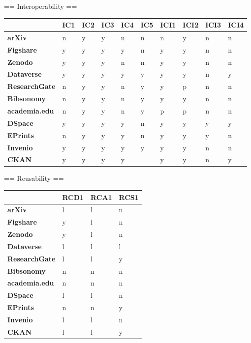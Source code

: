 == Interoperability ==

\begin{tabular}{|m{2.1cm}|m{0.8cm}|m{0.8cm}|m{0.8cm}|m{0.8cm}|m{0.8cm}|m{0.8cm}|m{0.8cm}|m{0.8cm}|m{0.8cm}|} \hline 
 & \textbf{IC1}  & \textbf{IC2}  & \textbf{IC3}  & \textbf{IC4}  & \textbf{IC5}  & \textbf{ICI1}  & \textbf{ICI2}  & \textbf{ICI3}  & \textbf{ICI4}  \\ \hline 
\textbf{arXiv}  &n &y &y &n &n &n &y &n &n \\ \hline 
\textbf{Figshare}  &y &y &y &y &n &y &y &n &n \\ \hline 
\textbf{Zenodo}  &y &y &y &n &n &y &y &n &n \\ \hline 
\textbf{Dataverse}  &y &y &y &y &y &y &y &n &y \\ \hline 
\textbf{ResearchGate}  &n &y &y &n &y &y &p &n &n \\ \hline 
\textbf{Bibsonomy}  &n &y &y &n &y &y &y &n &n \\ \hline 
\textbf{academia.edu}  &n &y &y &n &y &p &p &n &n \\ \hline 
 \hline 
\textbf{DSpace}  &y &y &y &y &n &y &y &y &y \\ \hline 
\textbf{EPrints}  &n &y &y &y &n &y &y &y &n \\ \hline 
\textbf{Invenio}  &y &y &y &y &y &y &y &n &n \\ \hline 
\textbf{CKAN}  &y &y &y &y & &y &y &n &y \\ \hline 
 \end{tabular}


== Reusability ==

\begin{tabular}{|m{2.1cm}|m{0.8cm}|m{0.8cm}|m{0.8cm}|} \hline 
 & \textbf{RCD1}  & \textbf{RCA1}  & \textbf{RCS1}  \\ \hline 
\textbf{arXiv}  &l &l &n \\ \hline 
\textbf{Figshare}  &y &l &n \\ \hline 
\textbf{Zenodo}  &y &l &n \\ \hline 
\textbf{Dataverse}  &l &l &l \\ \hline 
\textbf{ResearchGate}  &l &l &y \\ \hline 
\textbf{Bibsonomy}  &n &n &n \\ \hline 
\textbf{academia.edu}  &n &n &n \\ \hline 
 \hline 
\textbf{DSpace}  &l &l &n \\ \hline 
\textbf{EPrints}  &n &n &y \\ \hline 
\textbf{Invenio}  &l &l &n \\ \hline 
\textbf{CKAN}  &l &l &y \\ \hline 
 \end{tabular}


